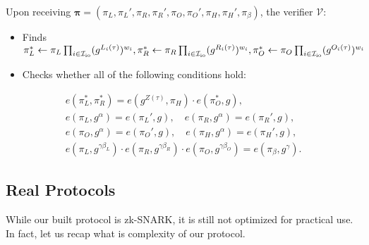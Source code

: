 \documentclass[../lecture-notes-148x210.tex]{subfiles}
\begin{document}
\begin{tcolorbox}
    Upon receiving $\boldsymbol{\pi} = (\pi_L,\pi_L',\pi_R,\pi_R',\pi_O,\pi_O',\pi_H,\pi_H',\pi_{\beta})$, the verifier $\mathcal{V}$:
    \begin{itemize}[label=]
        \item Finds $\pi_L^* \gets \pi_L\prod_{i \in \mathcal{I}_{\text{io}}} (g^{L_i(\tau)})^{w_i},\pi_R^* \gets \pi_R\prod_{i \in \mathcal{I}_{\text{io}}} (g^{R_i(\tau)})^{w_i}, \\
        \pi_O^* \gets \pi_O\prod_{i \in \mathcal{I}_{\text{io}}} (g^{O_i(\tau)})^{w_i}$
        \item Checks whether all of the following conditions hold:
    \end{itemize}
    \begin{align*}
        e(\pi_L^*, \pi_R^*) = e(g^{Z(\tau)}, \pi_H) \cdot e(\pi_O^*, g), \\
        e(\pi_L, g^{\alpha}) = e(\pi_L', g), \quad e(\pi_R, g^{\alpha}) = e(\pi_R', g), \\
        e(\pi_O, g^{\alpha}) = e(\pi_O', g), \quad e(\pi_H, g^{\alpha}) = e(\pi_H', g), \\
        e(\pi_L, g^{\gamma\beta_L}) \cdot e(\pi_R, g^{\gamma\beta_R}) \cdot e(\pi_O, g^{\gamma\beta_O}) = e(\pi_{\beta}, g^{\gamma}).
    \end{align*}
\end{tcolorbox}

\subsection{Real Protocols}

While our built protocol is zk-SNARK, it is still not optimized for practical use. In fact, let us recap what is complexity of our protocol.
\end{document}
